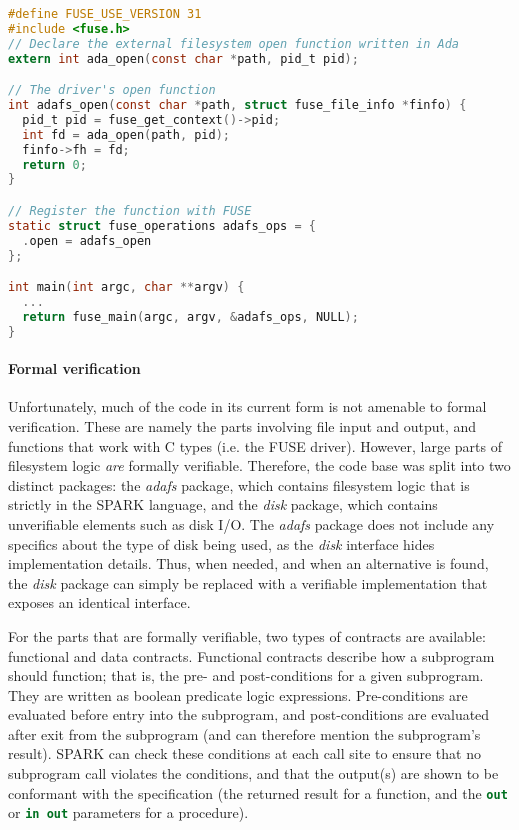 \begin{lstlisting}[caption={FUSE driver implementation of \textnormal{open}}, label={code:fuse open}, language=C]
#define FUSE_USE_VERSION 31
#include <fuse.h>
// Declare the external filesystem open function written in Ada
extern int ada_open(const char *path, pid_t pid);

// The driver's open function
int adafs_open(const char *path, struct fuse_file_info *finfo) {
  pid_t pid = fuse_get_context()->pid;
  int fd = ada_open(path, pid);
  finfo->fh = fd;
  return 0;
}

// Register the function with FUSE
static struct fuse_operations adafs_ops = {
  .open = adafs_open
};

int main(int argc, char **argv) {
  ...
  return fuse_main(argc, argv, &adafs_ops, NULL);
}
\end{lstlisting}

\paragraph{Formal verification}
Unfortunately, much of the code in its current form is not amenable to formal verification.
These are namely the parts involving file input and output, and functions that work with C types (i.e. the FUSE driver).
However, large parts of filesystem logic \textit{are} formally verifiable.
Therefore, the code base was split into two distinct packages: the \textit{adafs} package, which contains filesystem logic that is strictly in the SPARK language, and the \textit{disk} package, which contains unverifiable elements such as disk I/O.
The \textit{adafs} package does not include any specifics about the type of disk being used, as the \textit{disk} interface hides implementation details.
Thus, when needed, and when an alternative is found, the \textit{disk} package can simply be replaced with a verifiable implementation that exposes an identical interface.

For the parts that are formally verifiable, two types of contracts are available: functional and data contracts.
Functional contracts describe how a subprogram should function; that is, the pre- and post-conditions for a given subprogram.
They are written as boolean predicate logic expressions.
Pre-conditions are evaluated before entry into the subprogram, and post-conditions are evaluated after exit from the subprogram (and can therefore mention the subprogram's result).
SPARK can check these conditions at each call site to ensure that no subprogram call violates the conditions, and that the output(s) are shown to be conformant with the specification (the returned result for a function, and the \lstinline[language=Ada]{out} or \lstinline[language=Ada]{in out} parameters for a procedure).

